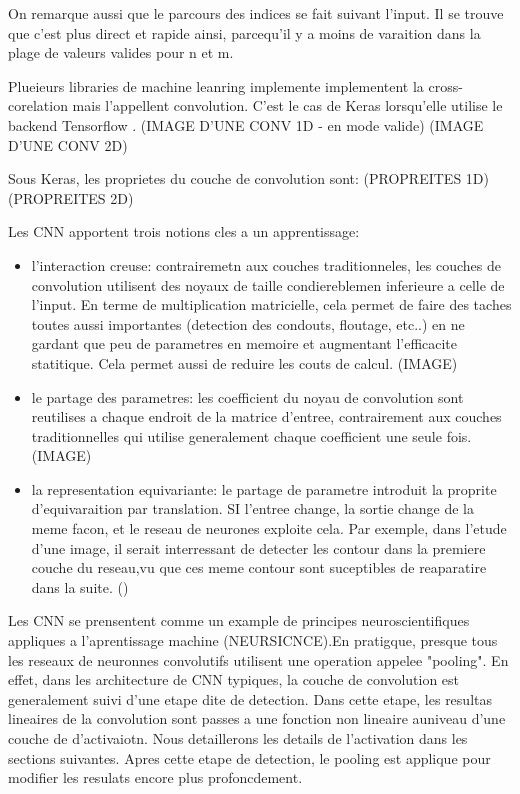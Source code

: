 On remarque aussi que le parcours des indices se fait suivant l'input. Il se trouve que c'est plus direct et rapide ainsi, parcequ'il y a moins de varaition dans la plage de valeurs valides pour n et m. 

Plueieurs libraries de machine leanring implemente implementent la cross-corelation mais l'appellent convolution. C'est le cas de Keras lorsqu'elle utilise le backend Tensorflow \parencite{Reference5}.
(IMAGE D'UNE CONV 1D - en mode valide)
(IMAGE D'UNE CONV 2D)

Sous Keras, les proprietes du couche de convolution sont:
(PROPREITES 1D)
(PROPREITES 2D)


Les CNN apportent trois notions cles a un apprentissage:
\begin{itemize}
 \item l'interaction creuse: contrairemetn aux couches traditionneles, les couches de convolution utilisent des noyaux de taille condiereblemen inferieure a celle de l'input. En terme de multiplication matricielle, cela permet de faire des taches toutes aussi importantes (detection des condouts, floutage, etc..) en ne gardant que peu de parametres en memoire et augmentant l'efficacite statitique. Cela permet aussi de reduire les couts de calcul.
 (IMAGE)
 \item le partage des parametres: les coefficient du noyau de convolution sont reutilises a chaque endroit de la matrice d'entree, contrairement aux couches traditionnelles qui utilise generalement chaque coefficient une seule fois.
 (IMAGE)
 \item la representation equivariante: le partage de parametre introduit la proprite d'equivaraition par translation. SI l'entree change, la sortie change de la meme facon, et le reseau de neurones exploite cela. Par exemple, dans l'etude d'une image, il serait interressant de detecter les contour dans la premiere couche du reseau,vu que ces meme contour sont suceptibles de reaparatire dans la suite. (\parencite{Reference5})
\end{itemize}


Les CNN se prensentent comme un example de principes neuroscientifiques appliques a l'aprentissage machine (NEURSICNCE).En pratigque, presque tous les reseaux de neuronnes convolutifs utilisent une operation appelee "pooling". En effet, dans les architecture de CNN typiques, la couche de convolution est generalement suivi d'une etape dite de detection. Dans cette etape, les resultas lineaires de la convolution sont passes a une fonction non lineaire auniveau d'une couche de d'activaiotn. Nous detaillerons les details de l'activation dans les sections suivantes. Apres cette etape de detection, le pooling est applique pour modifier les resulats encore plus profoncdement.

